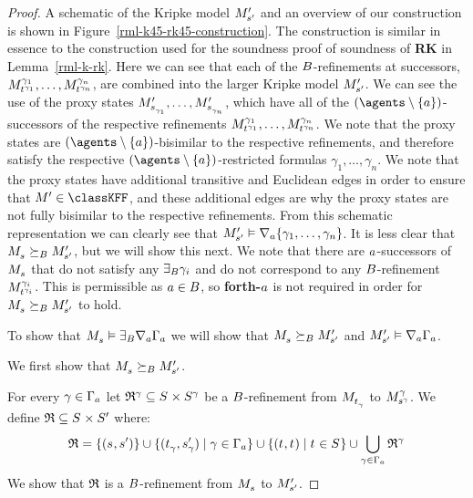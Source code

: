 \begin{proof}
A schematic of the Kripke model $\kPModelP{\kStateSP}$ and an overview of our construction is shown in Figure~\ref{rml-k45-rk45-construction}.
The construction is similar in essence to the construction used for the soundness proof of soundness of {\bf RK} in Lemma~\ref{rml-k-rk}.
Here we can see that each of the $\agentsB$-refinements at successors, $\kPModel[\gamma_1]{\kStateT[\gamma_1]}, \dots, \kPModel[\gamma_n]{\kStateT[\gamma_n]}$, are combined into the larger Kripke model $\kPModelP{\kStateSP}$.
We can see the use of the proxy states $\kPModelP{\kStateS_{\gamma_1}}, \dots, \kPModelP{\kStateS_{\gamma_n}}$, which have all of the $(\agents \setminus \{\agentA\})$-successors of the respective refinements $\kPModel[\gamma_1]{\kStateT[\gamma_1]}, \dots, \kPModel[\gamma_n]{\kStateT[\gamma_n]}$.
We note that the proxy states are $(\agents \setminus \{\agentA\})$-bisimilar to the respective refinements, and therefore satisfy the respective $(\agents \setminus \{\agentA\})$-restricted formulas $\gamma_1, \dots, \gamma_n$.
We note that the proxy states have additional transitive and Euclidean edges in order to ensure that $\kModelP \in \classKFF$, and these additional edges are why the proxy states are not fully bisimilar to the respective refinements.
From this schematic representation we can clearly see that $\kPModelP{\kStateSP} \entails \coversA \{\gamma_1, \dots, \gamma_n\}$.
It is less clear that $\kPModel{\kStateS} \simulatesBs \kPModelP{\kStateSP}$, but we will show this next.
We note that there are $\agentA$-successors of $\kPModel{\kStateS}$ that do not satisfy any $\somerefsBs \gamma_i$ and do not correspond to any $\agentsB$-refinement $\kPModel[\gamma_i]{\kStateT[\gamma_i]}$.
This is permissible as $\agentA \in \agentsB$, so {\bf forth-$\agentA$} is not required in order for $\kPModel{\kStateS} \simulatesBs \kPModelP{\kStateSP}$ to hold.

To show that $\kPModel{\kStateS} \entails \somerefsBs \coversA \Gamma_\agentA$ we will show that $\kPModel{\kStateS} \simulatesBs \kPModelP{\kStateSP}$ and $\kPModelP{\kStateSP} \entails \coversA \Gamma_\agentA$.

We first show that $\kPModel{\kStateS} \simulatesBs \kPModelP{\kStateSP}$.

For every $\gamma \in \Gamma_\agentA$ let $\refinement^\gamma \subseteq \kStates \times \kStates[\gamma]$ be a $\agentsB$-refinement from $\kPModel{\kStateT_\gamma}$ to $\kPModel[\gamma]{\kStateS[\gamma]}$.
We define $\refinement \subseteq \kStates \times \kStatesP$ where:
$$
\refinement = \{(\kStateS, \kStateSP)\} \cup \{(\kStateT_\gamma, \kStateSP_\gamma) \mid \gamma \in \Gamma_\agentA\} \cup \{(\kStateT, \kStateT) \mid \kStateT \in \kStates\} \cup \bigcup_{\gamma \in \Gamma_\agentA} \refinement^\gamma
$$
We show that $\refinement$ is a $\agentsB$-refinement from $\kPModel{\kStateS}$ to $\kPModelP{\kStateSP}$.


\end{proof}
